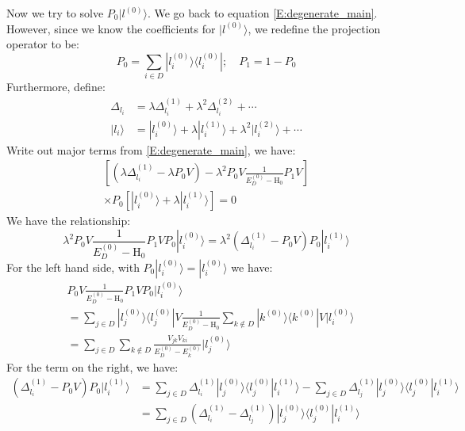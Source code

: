 \documentclass{article}
\newcommand{\huptb}{\text{H}_0}
\newcommand{\order}[2]{#1^{(#2)}}
\newcommand{\statebra}[1]{\langle #1 |}
\newcommand{\stateket}[1]{| #1 \rangle}
\begin{document}
Now we try to solve $P_0 \stateket{\order{l}{0}}$. We go back to equation \eqref{E:degenerate_main}.
However, since we know the coefficients for $\stateket{\order{l}{0}}$, we redefine the projection 
operator to be:
\begin{equation}
    P_0 = \sum_{i\in D} \stateket{\order{l_i}{0}} \statebra{\order{l_i}{0}}; \quad P_1 = 1 - P_0
\end{equation}
Furthermore, define:
\begin{align}    
    \Delta_{l_i} &= \lambda \order{\Delta_{l_i}}{1} + \lambda^2 \order{\Delta_{l_i}}{2} + \cdots \\
    \stateket{l_i} &= \stateket{\order{l_i}{0}} + \lambda \stateket{\order{l_i}{1}} + 
                    \lambda^2 \stateket{\order{l_i}{2}} + \cdots
\end{align}
Write out major terms from \eqref{E:degenerate_main}, we have:
\begin{align}
    \left[ (\lambda \order{\Delta_{l_i}}{1} - \lambda P_0 V ) - \lambda^2 P_0 V \frac{1}{\order{E_D}{0} - \huptb} P_1 V \right] \\ 
    \times P_0 \left[ \stateket{\order{l_i}{0}} + \lambda \stateket{\order{l_i}{1}} \right] = 0
\end{align}
We have the relationship:
\begin{equation}
    \lambda^2 P_0 V \frac{1}{\order{E_D}{0} - \huptb} P_1 V P_0 \stateket{\order{l_i}{0}} 
    = \lambda^2 (\order{\Delta_{l_i}}{1} - P_0 V ) P_0 \stateket{\order{l_i}{1}} 
\end{equation}
For the left hand side, with $P_0 \stateket{\order{l_i}{0}} = \stateket{\order{l_i}{0}}$ we have:
\begin{align}
    & P_0 V \frac{1}{\order{E_D}{0} - \huptb} P_1 V P_0 \stateket{\order{l_i}{0}} \\
    &= \sum_{j\in D} \stateket{ \order{l_j}{0} } \statebra{\order{l_j}{0}} V \frac{1}{\order{E_D}{0} - \huptb} 
    \sum_{k\notin D} \stateket{ \order{k}{0} } \statebra{\order{k}{0}} V \stateket{\order{l_i}{0}} \\ 
    &= \sum_{j\in D} 
        \sum_{k\notin D} \frac{V_{jk}V_{ki}}{\order{E_D}{0} - \order{E_k}{0}} \stateket{ \order{l_j}{0} }
\end{align}
For the term on the right, we have:
\begin{align}
    (\order{\Delta_{l_i}}{1} - P_0 V ) P_0 \stateket{\order{l_i}{1}}  
    &= \sum_{j\in D} \order{\Delta_{l_i}}{1} \stateket{ \order{l_j}{0} } \statebra{\order{l_j}{0}} \order{l_i}{1} \rangle
    - \sum_{j\in D} \order{\Delta_{l_j}}{1} \stateket{ \order{l_j}{0} } \statebra{\order{l_j}{0}} \order{l_i}{1} \rangle \\ 
    &= \sum_{j\in D} (\order{\Delta_{l_i}}{1} - \order{\Delta_{l_j}}{1}) \stateket{ \order{l_j}{0} } \statebra{\order{l_j}{0}} \order{l_i}{1} \rangle
\end{align}
\end{document}
